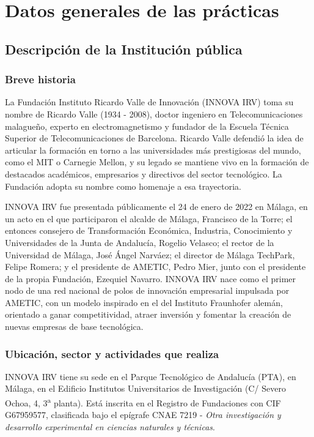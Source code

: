 \chapter{Datos generales de las prácticas}

\section{Descripción de la Institución pública}

\subsection{Breve historia}

La Fundación Instituto Ricardo Valle de Innovación (INNOVA IRV) toma su nombre de Ricardo Valle (1934 - 2008), doctor ingeniero en Telecomunicaciones malagueño, experto en electromagnetismo y fundador de la Escuela Técnica Superior de Telecomunicaciones de Barcelona. Ricardo Valle defendió la idea de articular la formación en torno a las universidades más prestigiosas del mundo, como el MIT o Carnegie Mellon, y su legado se mantiene vivo en la formación de destacados académicos, empresarios y directivos del sector tecnológico. La Fundación adopta su nombre como homenaje a esa trayectoria.

INNOVA IRV fue presentada públicamente el 24 de enero de 2022 en Málaga, en un acto en el que participaron el alcalde de Málaga, Francisco de la Torre; el entonces consejero de Transformación Económica, Industria, Conocimiento y Universidades de la Junta de Andalucía, Rogelio Velasco; el rector de la Universidad de Málaga, José Ángel Narváez; el director de Málaga TechPark, Felipe Romera; y el presidente de AMETIC, Pedro Mier, junto con el presidente de la propia Fundación, Ezequiel Navarro. INNOVA IRV nace como el primer nodo de una red nacional de polos de innovación empresarial impulsada por AMETIC, con un modelo inspirado en el del Instituto Fraunhofer alemán, orientado a ganar competitividad, atraer inversión y fomentar la creación de nuevas empresas de base tecnológica.

\subsection{Ubicación, sector y actividades que realiza}

INNOVA IRV tiene su sede en el Parque Tecnológico de Andalucía (PTA), en Málaga, en el Edificio Institutos Universitarios de Investigación (C/ Severo Ochoa, 4, 3\textsuperscript{a} planta). Está inscrita en el Registro de Fundaciones con CIF G67959577, clasificada bajo el epígrafe CNAE 7219 - \emph{Otra investigación y desarrollo experimental en ciencias naturales y técnicas}.

